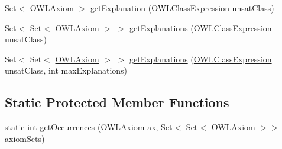 \begin{DoxyCompactItemize}
\item 
Set$<$ \hyperlink{interfaceorg_1_1semanticweb_1_1owlapi_1_1model_1_1_o_w_l_axiom}{O\-W\-L\-Axiom} $>$ \hyperlink{classcom_1_1clarkparsia_1_1owlapi_1_1explanation_1_1_h_s_t_explanation_generator_a72a9283a5fc35489c4ee4c4cfb847b69}{get\-Explanation} (\hyperlink{interfaceorg_1_1semanticweb_1_1owlapi_1_1model_1_1_o_w_l_class_expression}{O\-W\-L\-Class\-Expression} unsat\-Class)
\item 
Set$<$ Set$<$ \hyperlink{interfaceorg_1_1semanticweb_1_1owlapi_1_1model_1_1_o_w_l_axiom}{O\-W\-L\-Axiom} $>$ $>$ \hyperlink{classcom_1_1clarkparsia_1_1owlapi_1_1explanation_1_1_h_s_t_explanation_generator_a3482fb23d0645f75000ba850ec863810}{get\-Explanations} (\hyperlink{interfaceorg_1_1semanticweb_1_1owlapi_1_1model_1_1_o_w_l_class_expression}{O\-W\-L\-Class\-Expression} unsat\-Class)
\item 
Set$<$ Set$<$ \hyperlink{interfaceorg_1_1semanticweb_1_1owlapi_1_1model_1_1_o_w_l_axiom}{O\-W\-L\-Axiom} $>$ $>$ \hyperlink{classcom_1_1clarkparsia_1_1owlapi_1_1explanation_1_1_h_s_t_explanation_generator_ae715599d61131b22e90c7592087ebfdf}{get\-Explanations} (\hyperlink{interfaceorg_1_1semanticweb_1_1owlapi_1_1model_1_1_o_w_l_class_expression}{O\-W\-L\-Class\-Expression} unsat\-Class, int max\-Explanations)
\end{DoxyCompactItemize}
\subsection*{Static Protected Member Functions}
\begin{DoxyCompactItemize}
\item 
static int \hyperlink{classcom_1_1clarkparsia_1_1owlapi_1_1explanation_1_1_h_s_t_explanation_generator_a5abb3ca67b101768130048bf9249b661}{get\-Occurrences} (\hyperlink{interfaceorg_1_1semanticweb_1_1owlapi_1_1model_1_1_o_w_l_axiom}{O\-W\-L\-Axiom} ax, Set$<$ Set$<$ \hyperlink{interfaceorg_1_1semanticweb_1_1owlapi_1_1model_1_1_o_w_l_axiom}{O\-W\-L\-Axiom} $>$$>$ axiom\-Sets)
\end{DoxyCompactItemize}
